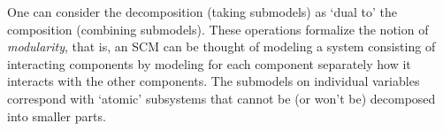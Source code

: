 One can consider the decomposition (taking submodels) as `dual to' the composition (combining submodels).
These operations formalize the notion of \emph{modularity}, that is, an SCM can be thought of modeling a system consisting of interacting components by modeling for each component separately how it interacts with the other components.
The submodels on individual variables correspond with `atomic' subsystems that cannot be (or won't be) decomposed into smaller parts.

